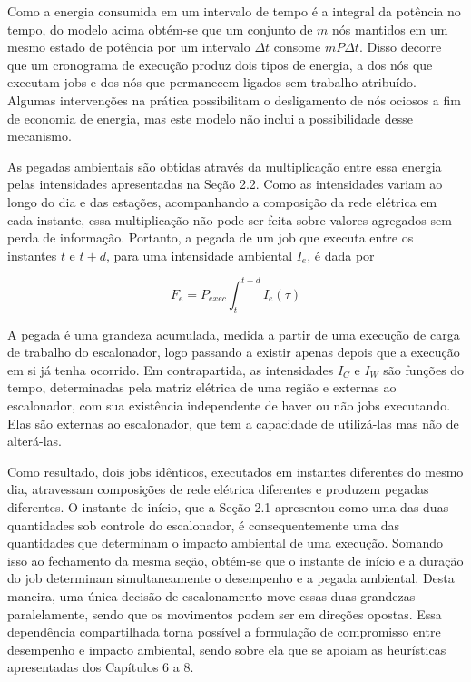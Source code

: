 Como a energia consumida em um intervalo de tempo é a integral da potência no tempo, do modelo acima obtém-se que
um conjunto de $m$ nós mantidos em um mesmo estado de potência por um intervalo $\Delta t$ consome $m P \Delta t$.
Disso decorre que um cronograma de execução produz dois tipos de energia, a dos nós que executam jobs e dos nós que
permanecem ligados sem trabalho atribuído. Algumas intervenções na prática possibilitam o desligamento de nós
ociosos a fim de economia de energia, mas este modelo não inclui a possibilidade desse mecanismo.

As pegadas ambientais são obtidas através da multiplicação entre essa energia pelas intensidades apresentadas na Seção 2.2.
Como as intensidades variam ao longo do dia e das estações, acompanhando a composição da rede elétrica em cada instante,
essa multiplicação não pode ser feita sobre valores agregados sem perda de informação. Portanto, a pegada de um job que
executa entre os instantes $t$ e $t + d$, para uma intensidade ambiental $I_{e}$, é dada por

\begin{equation}
\label{eq:pegada}
F_{e} = P_{exec} \int_{t}^{t + d} I_{e}(\tau)
\end{equation}

A pegada é uma grandeza acumulada, medida a partir de uma execução de carga de trabalho do escalonador, logo
passando a existir apenas depois que a execução em si já tenha ocorrido. Em contrapartida, as intensidades $I_{C}$ e $I_{W}$
são funções do tempo, determinadas pela matriz elétrica de uma região e externas ao escalonador, com sua existência
independente de haver ou não jobs executando. Elas são externas ao escalonador, que tem a capacidade de 
utilizá-las mas não de alterá-las. 

Como resultado, dois jobs idênticos, executados em instantes diferentes do mesmo dia, atravessam composições de rede
elétrica diferentes e produzem pegadas diferentes. O instante de início, que a Seção 2.1 apresentou como uma
das duas quantidades sob controle do escalonador, é consequentemente uma das quantidades que determinam o impacto
ambiental de uma execução. Somando isso ao fechamento da mesma seção, obtém-se que o instante de início e a duração do job
determinam simultaneamente o desempenho e a pegada ambiental. Desta maneira, uma única decisão de escalonamento
move essas duas grandezas paralelamente, sendo que os movimentos podem ser em direções opostas. Essa 
dependência compartilhada torna possível a formulação de compromisso entre desempenho e impacto ambiental, sendo 
sobre ela que se apoiam as heurísticas apresentadas dos Capítulos 6 a 8.

